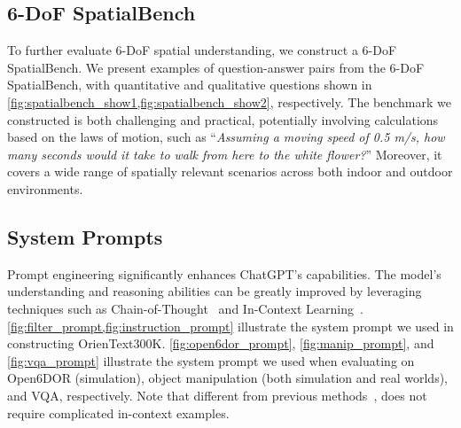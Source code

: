 \subsection{6-DoF SpatialBench}
To further evaluate 6-DoF spatial understanding, we construct a 6-DoF SpatialBench.
We present examples of question-answer pairs from the 6-DoF SpatialBench, with quantitative and qualitative questions shown in \cref{fig:spatialbench_show1,fig:spatialbench_show2}, respectively. 
The benchmark we constructed is both challenging and practical, potentially involving calculations based on the laws of motion, such as ``\textit{Assuming a moving speed of 0.5 m/s, how many seconds would it take to walk from here to the white flower?}'' Moreover, it covers a wide range of spatially relevant scenarios across both indoor and outdoor environments.


\subsection{System Prompts}
Prompt engineering significantly enhances ChatGPT's capabilities. The model's understanding and reasoning abilities can be greatly improved by leveraging techniques such as Chain-of-Thought~\cite{CoT22} and In-Context Learning~\cite{GPT3_20}. \cref{fig:filter_prompt,fig:instruction_prompt} illustrate the system prompt we used in constructing OrienText300K.
\cref{fig:open6dor_prompt}, \cref{fig:manip_prompt}, and \cref{fig:vqa_prompt} illustrate the system prompt we used when evaluating \sofar on Open6DOR (simulation), object manipulation (both simulation and real worlds), and VQA, respectively.
Note that different from previous methods~\cite{VoxPoser23,ReKep24}, \sofar does not require complicated in-context examples.




